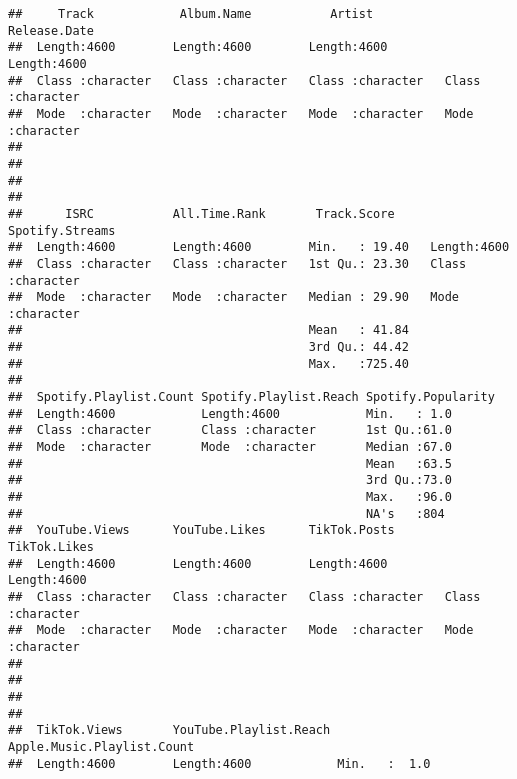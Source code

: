 \documentclass[
]{article}
\begin{document}
\begin{verbatim}
##     Track            Album.Name           Artist          Release.Date      
##  Length:4600        Length:4600        Length:4600        Length:4600       
##  Class :character   Class :character   Class :character   Class :character  
##  Mode  :character   Mode  :character   Mode  :character   Mode  :character  
##                                                                             
##                                                                             
##                                                                             
##                                                                             
##      ISRC           All.Time.Rank       Track.Score     Spotify.Streams   
##  Length:4600        Length:4600        Min.   : 19.40   Length:4600       
##  Class :character   Class :character   1st Qu.: 23.30   Class :character  
##  Mode  :character   Mode  :character   Median : 29.90   Mode  :character  
##                                        Mean   : 41.84                     
##                                        3rd Qu.: 44.42                     
##                                        Max.   :725.40                     
##                                                                           
##  Spotify.Playlist.Count Spotify.Playlist.Reach Spotify.Popularity
##  Length:4600            Length:4600            Min.   : 1.0      
##  Class :character       Class :character       1st Qu.:61.0      
##  Mode  :character       Mode  :character       Median :67.0      
##                                                Mean   :63.5      
##                                                3rd Qu.:73.0      
##                                                Max.   :96.0      
##                                                NA's   :804       
##  YouTube.Views      YouTube.Likes      TikTok.Posts       TikTok.Likes      
##  Length:4600        Length:4600        Length:4600        Length:4600       
##  Class :character   Class :character   Class :character   Class :character  
##  Mode  :character   Mode  :character   Mode  :character   Mode  :character  
##                                                                             
##                                                                             
##                                                                             
##                                                                             
##  TikTok.Views       YouTube.Playlist.Reach Apple.Music.Playlist.Count
##  Length:4600        Length:4600            Min.   :  1.0             

\end{verbatim}
\end{document}
